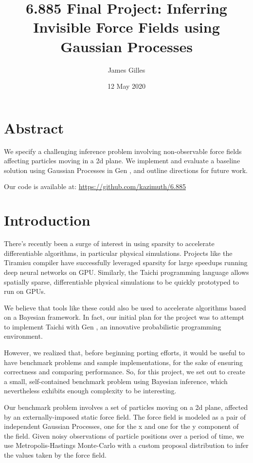 \documentclass[11pt]{article}
\author{James Gilles}
\date{12 May 2020}
\title{6.885 Final Project: Inferring Invisible Force Fields using Gaussian Processes}
\renewcommand*{\tableofcontents}[0]{}
\begin{document}
\maketitle
\tableofcontents


\section{Abstract}
\label{sec:org45b522b}
We specify a challenging inference problem involving non-observable force fields affecting particles moving in a 2d plane. We implement and evaluate a baseline solution using Gaussian Processes in Gen \citep{GenPaper}, and outline directions for future work.

Our code is available at: \url{https://github.com/kazimuth/6.885}

\section{Introduction}
\label{sec:orgb8c3784}
There's recently been a surge of interest in using sparsity to accelerate differentiable algorithms, in particular physical simulations. Projects like the Tiramisu compiler \citep{Tiramisu} have successfully leveraged sparsity for large speedups running deep neural networks on GPU. Similarly, the Taichi programming language \citep{Taichi} allows spatially sparse, differentiable physical simulations to be quickly prototyped to run on GPUs.

We believe that tools like these could also be used to accelerate algorithms based on a Bayesian framework. In fact, our initial plan for the project was to attempt to implement Taichi with Gen \citep{GenPaper}, an innovative probabilistic programming environment.

However, we realized that, before beginning porting efforts, it would be useful to have benchmark problems and sample implementations, for the sake of ensuring correctness and comparing performance. So, for this project, we set out to create a small, self-contained benchmark problem using Bayesian inference, which nevertheless exhibits enough complexity to be interesting.

Our benchmark problem involves a set of particles moving on a 2d plane, affected by an externally-imposed static force field. The force field is modeled as a pair of independent Gaussian Processes, one for the x and one for the y component of the field. Given noisy observations of particle positions over a period of time, we use Metropolis-Hastings Monte-Carlo with a custom proposal distribution to infer the values taken by the force field.
\end{document}
